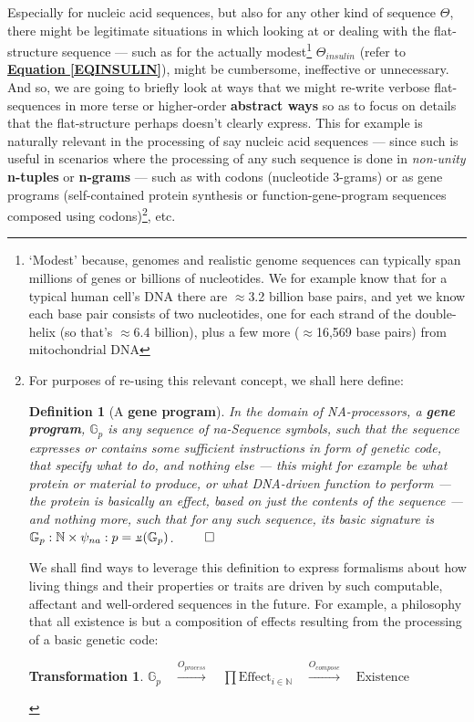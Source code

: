 \documentclass[a4paper, 18pt]{book} %
\newtheorem{defn}{Definition}
\newtheorem{trans}{Transformation}
\newcommand{\invpi}{\rotatebox[origin=c]{180}{$\pi$}}
\begin{document}
Especially for nucleic acid sequences, but also for any other kind of sequence $\Theta$, there might be legitimate situations in which looking at or dealing with the flat-structure sequence --- such as for the actually modest\footnote{`Modest' because, genomes and realistic genome sequences can typically span millions of genes or billions of nucleotides. We for example know that for a typical human cell's DNA there are $\approx$3.2 billion base pairs\cite{Venter2001}, and yet we know each base pair consists of two nucleotides, one for each strand of the double-helix (so that's $\approx$6.4 billion), plus a few more ($\approx$16,569 base pairs) from mitochondrial DNA\cite{Anderson1981}} $\Theta_{insulin}$ (refer to \textbf{\hyperref[EQINSULIN]{Equation \ref{EQINSULIN}}}), might be cumbersome, ineffective or unnecessary. And so, we are going to briefly look at ways that we might re-write verbose flat-sequences in more terse or higher-order \textbf{abstract ways} so as to focus on details that the flat-structure perhaps doesn't clearly express. This for example is naturally relevant in the processing of say nucleic acid sequences --- since such is useful in scenarios where the processing of any such sequence is done in \textit{non-unity} \textbf{n-tuples} or \textbf{n-grams} --- such as with codons (nucleotide 3-grams) or as gene programs (self-contained protein synthesis or function-gene-program sequences composed using codons)\footnote{
For purposes of re-using this relevant concept, we shall here define: 

\begin{defn}[A \textbf{gene program}]
\label{DEFGENPROG}
 In the domain of NA-processors, a \textbf{gene program}, $\mathbb{G}_{p}$ is any sequence of na-Sequence symbols, such that the sequence expresses or contains some sufficient instructions in form of genetic code, that specify what to do, and nothing else --- this might for example be what protein or material to produce, or what DNA-driven function to perform --- the protein is basically an effect, based on just the contents of the sequence --- and nothing more, such that for any such sequence, its basic signature is $\mathbb{G}_{p}: \mathbb{N} \times \psi_{na}:p=\invpi(\mathbb{G}_{p})$.
$\qed$
\end{defn} We shall find ways to leverage this definition to express formalisms about how living things and their properties or traits are driven by such computable, affectant and well-ordered sequences in the future. For example, a philosophy that all existence is but a composition of effects resulting from the processing of a basic genetic code:

\begin{trans}
\label{TRANSTOENASEQ}
$\mathbb{G}_{p}  \quad \xrightarrow{O_{process}} \quad \prod \text{Effect}_{i \in \mathbb{N}}  \quad \xrightarrow{O_{compose}}  \quad \text{Existence}$
\end{trans}

}, etc.
\end{document}
